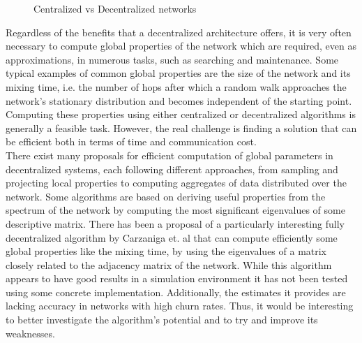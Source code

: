 \documentclass[a4paper,11pt,twoside]{report}
\begin{document}
\begin{figure}[h]
\centering
{}
\qquad
{}
\caption{Centralized vs Decentralized networks}
\end{figure}

Regardless of the benefits that a decentralized architecture offers, it is very often necessary to compute global properties of the network which are required, even as approximations, in numerous tasks, such as searching and maintenance. Some typical examples of common global properties are the size of the network and its mixing time, i.e. the number of hops after which a random walk approaches the network's stationary distribution and becomes independent of the starting point. Computing these properties using either centralized or decentralized algorithms is generally a feasible task. However, the real challenge is finding a solution that can be efficient both in terms of time and communication cost.\\


There exist many proposals for efficient computation of global parameters in decentralized systems, each following different approaches, from sampling and projecting local properties to computing aggregates of data distributed over the network. Some algorithms are based on deriving useful properties from the spectrum of the network by computing the most significant eigenvalues of some descriptive matrix. There has been a proposal of a particularly interesting fully decentralized algorithm by Carzaniga et. al\cite{6195806} that can compute efficiently some global properties like the mixing time, by using the eigenvalues of a matrix closely related to the adjacency matrix of the network. While this algorithm appears to have good results in a simulation environment it has not been tested using some concrete implementation. Additionally, the estimates it provides are lacking accuracy in networks with high churn rates. Thus, it would be interesting to better investigate the algorithm's potential and to try and improve its weaknesses.
\end{document}
